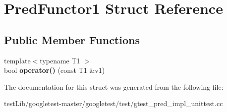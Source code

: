 \hypertarget{structPredFunctor1}{}\section{Pred\+Functor1 Struct Reference}
\label{structPredFunctor1}
\subsection*{Public Member Functions}
\begin{DoxyCompactItemize}
\item 
\mbox{\label{structPredFunctor1_a78d81d1bac0ee7f81ea631c49bfab3e2}} 
{\footnotesize template$<$typename T1 $>$ }\\bool {\bfseries operator()} (const T1 \&v1)
\end{DoxyCompactItemize}


The documentation for this struct was generated from the following file\+:\begin{DoxyCompactItemize}
\item 
test\+Lib/googletest-\/master/googletest/test/gtest\+\_\+pred\+\_\+impl\+\_\+unittest.\+cc\end{DoxyCompactItemize}
